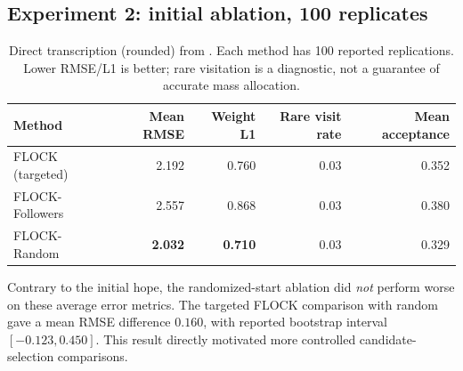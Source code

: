 \documentclass[11pt,letterpaper]{article}
\begin{document}
\subsection{Experiment 2: initial ablation, 100 replicates}
\begin{table}[H]\centering\small
\begin{tabular}{lrrrr}
\toprule
Method & Mean RMSE & Weight L1 & Rare visit rate & Mean acceptance\\
\midrule
FLOCK (targeted) & 2.192 & 0.760 & 0.03 & 0.352\\
FLOCK-Followers & 2.557 & 0.868 & 0.03 & 0.380\\
FLOCK-Random & \textbf{2.032} & \textbf{0.710} & 0.03 & 0.329\\
\bottomrule
\end{tabular}
\caption{Direct transcription (rounded) from \protect{}. Each method has 100 reported replications. Lower RMSE/L1 is better; rare visitation is a diagnostic, not a guarantee of accurate mass allocation.}
\end{table}
Contrary to the initial hope, the randomized-start ablation did \emph{not} perform worse on these average error metrics. The targeted FLOCK comparison with random gave a mean RMSE difference \(0.160\), with reported bootstrap interval \([-0.123,0.450]\). This result directly motivated more controlled candidate-selection comparisons.
\end{document}
